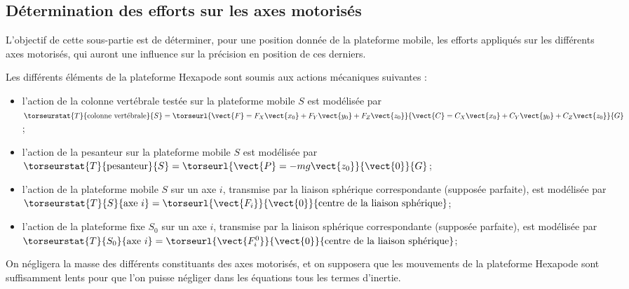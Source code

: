 \ifprof
\begin{corrige}
\end{corrige}
\else
\fi

\subsection{Détermination des efforts sur les axes motorisés}
\begin{obj}
L’objectif de cette sous-partie est de déterminer, pour une position donnée de la plateforme mobile, les
efforts appliqués sur les différents axes motorisés, qui auront une influence sur la précision en position
de ces derniers.
\end{obj}


Les différents éléments de la plateforme Hexapode sont soumis aux actions mécaniques suivantes :
\begin{itemize}
\item l’action de la colonne vertébrale testée sur la plateforme mobile $S$ est modélisée par 
$\torseurstat{T}{\text{colonne vertébrale}}{S} = 
\torseurl{\vect{F}=F_X\vect{x_0}+F_Y\vect{y_0}+F_Z\vect{z_0}}
{\vect{C}=C_X\vect{x_0}+C_Y\vect{y_0}+C_Z\vect{z_0}}{G}$;
\item l’action de la pesanteur sur la plateforme mobile $S$ est modélisée par 
$\torseurstat{T}{\text{pesanteur}}{S} = \torseurl{\vect{P}=-mg\vect{z_0}}{\vect{0}}{G}$;
\item l'action de la plateforme mobile $S$ sur un axe $i$, transmise par la liaison sphérique correspondante (supposée parfaite), est modélisée par
$\torseurstat{T}{S}{\text{axe } i} = \torseurl{\vect{F_i}}{\vect{0}}{\text{centre de la liaison sphérique}}$;
\item l'action de la plateforme fixe $S_0$ sur un axe $i$, transmise par la liaison sphérique correspondante (supposée parfaite), est modélisée par
$\torseurstat{T}{S_0}{\text{axe } i} = \torseurl{\vect{F_i^0}}{\vect{0}}{\text{centre de la liaison sphérique}}$;
\end{itemize}

On négligera la masse des différents constituants des axes motorisés, et on supposera que les mouvements de la
plateforme Hexapode sont suffisamment lents pour que l’on puisse négliger dans les équations tous les termes
d’inertie.

